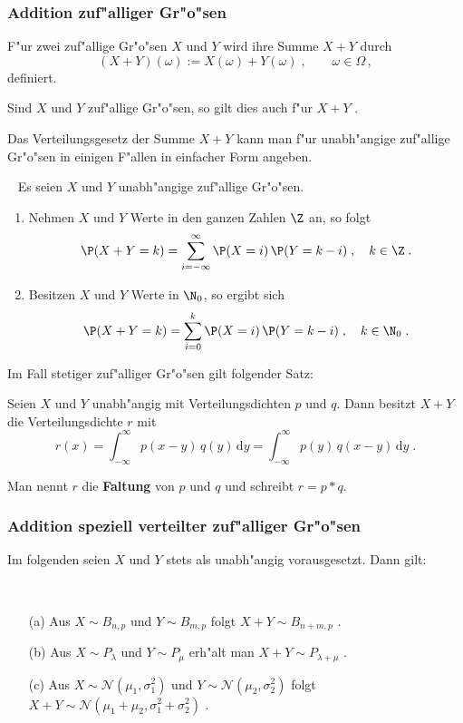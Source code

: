\subsubsection{Addition zuf"alliger Gr"o"sen}
F"ur zwei zuf"allige Gr"o"sen $X$  und $Y$ wird ihre Summe $X+Y$ durch
$$
(X+Y)(\omega):=X(\omega)+Y(\omega)\;,\qquad \omega\in\Omega\,,
$$
definiert.
\begin{thm}
Sind $X$ und $Y$ zuf"allige Gr"o"sen, so gilt dies auch f"ur $X+Y$ .
\end{thm}
Das Verteilungsgesetz der Summe $X+Y$ kann man f"ur unabh"angige zuf"allige Gr"o"sen in einigen
F"allen in einfacher Form angeben.
\begin{thm}~
Es seien $X$ und $Y$ unabh"angige zuf"allige Gr"o"sen.
\begin{enumerate}
\item
Nehmen $X$ und $Y$ Werte in den ganzen Zahlen $\Z$ an, so folgt
$$
\P(X+Y=k)=\sum_{i=-\infty}^\infty\P(X=i)\,\P(Y=k-i)\;,\quad k\in \Z\;.
$$
\item
Besitzen $X$ und $Y$ Werte in $\N_0$, so ergibt sich
$$
\P(X+Y=k)=\sum_{i=0}^k\P(X=i)\,\P(Y=k-i)\;,\quad k\in \N_0\;.
$$
\end{enumerate}
\end{thm}
Im Fall stetiger zuf"alliger Gr"o"sen gilt folgender Satz$\colon$
\begin{thm}
Seien $X$ und $Y$ unabh"angig mit Verteilungsdichten $p$ und $q$. Dann besitzt $X+Y$
die Verteilungsdichte $r$  mit
$$
r(x)=\int_{-\infty}^\infty p(x-y)\,q(y)\,\mathrm d y = \int_{-\infty}^\infty p(y)\,q(x-y)\,\mathrm d y \;.
$$
\end{thm}
Man nennt $r$ die \textbf{Faltung} von $p$ und $q$ und schreibt $r=p*q$.
\subsubsection{Addition speziell verteilter zuf"alliger Gr"o"sen}
Im folgenden seien $X$ und $Y$ stets als unabh"angig vorausgesetzt. Dann gilt$\colon$
\begin{thm}~
\begin{enumerate}
\item[\rm (a)]
Aus $X\sim B_{n,p}$ und $Y\sim B_{m,p}$ folgt $X+Y\sim B_{n+m,p}$  .
\item[\rm (b)]
Aus $X\sim P_\lambda$ und $Y\sim P_\mu$ erh"alt man $X+Y\sim P_{\lambda+\mu}$ .
\item[\rm (c)]
Aus $X\sim\mathcal N(\mu_1,\sigma_1^2)$ und $Y\sim\mathcal N(\mu_2,\sigma_2^2)$ folgt
$X+Y\sim \mathcal N(\mu_1+\mu_2,\sigma_1^2+\sigma_2^2)$ .
\end{enumerate}
\end{thm}
